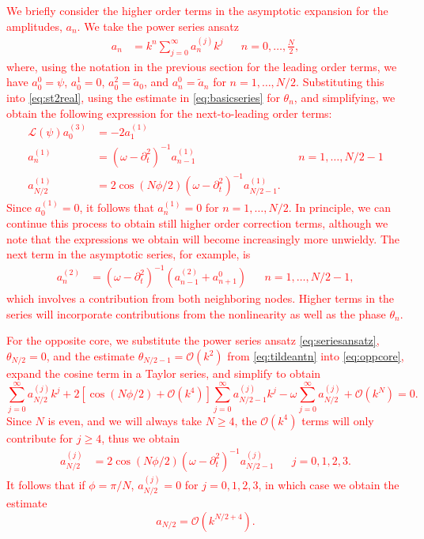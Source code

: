 \documentclass[11pt,reqno]{amsart}
\def\calL{{\mathcal L}}
\newcommand{\revised}[1]{ \textcolor{red}{#1} }
\begin{document}
\revised{
We briefly consider the higher order terms in the asymptotic expansion for the amplitudes, $a_n$. We take the power series ansatz
\begin{align}\label{eq:seriesansatz}
a_n &= k^n \sum_{j=0}^\infty a_n^{(j)} k^j && n = 0, \dots, \frac{N}{2},
\end{align}
where, using the notation in the previous section for the leading order terms, we have $a_0^{0}= \psi$, $a_0^{1}=0$, $a_0^{2} = \tilde{a}_0$, and $a_n^{0} = \tilde{a}_n$ for $n = 1, \dots, N/2$. Substituting this into \cref{eq:st2real}, using the estimate in \cref{eq:basicseries} for $\theta_n$, and simplifying, we obtain the following expression for the next-to-leading order terms:
\begin{align*}
\calL(\psi) a_0^{(3)} &= -2 a_1^{(1)} \\
a_n^{(1)} &= (\omega - \partial_t^2)^{-1}a_{n-1}^{(1)} && n = 1, \dots, N/2-1 \\
a_{N/2}^{(1)} &= 2 \cos( N\phi/2)(\omega - \partial_t^2)^{-1} a_{N/2-1}^{(1)}.
\end{align*}
Since $a_0^{(1)}=0$, it follows that $a_n^{(1)}=0$ for $n = 1, \dots, N/2$. In principle, we can continue this process to obtain still higher order correction terms, although we note that the expressions we obtain will become increasingly more unwieldy. The next term in the asymptotic series, for example, is
\begin{align*}
a_n^{(2)} &= (\omega - \partial_t^2)^{-1}(a_{n-1}^{(2)} + a_{n+1}^{0}) && n = 1, \dots, N/2-1,
\end{align*}
which involves a contribution from both neighboring nodes. Higher terms in the series will incorporate contributions from the nonlinearity as well as the phase $\theta_n$.
}

\revised{
For the opposite core, we substitute the power series ansatz \cref{eq:seriesansatz}, $\theta_{N/2}=0$, and the estimate $\theta_{N/2-1} = \mathcal{O}(k^2)$ from \cref{eq:tildeantn} into \cref{eq:oppcore}, expand the cosine term in a Taylor series, and simplify to obtain
\[
\sum_{j=0}^\infty a_{N/2}^{(j)} k^j + 2 \left[\cos( N\phi/2) + \mathcal{O}(k^4) \right] \sum_{j=0}^\infty a_{N/2-1}^{(j)} k^j - \omega \sum_{j=0}^\infty a_{N/2}^{(j)} + \mathcal{O}(k^N) = 0.
\]
Since $N$ is even, and we will always take $N\geq 4$, the $\mathcal{O}(k^4)$ terms will only contribute for $j \geq 4$, thus we obtain
\begin{align*}
a_{N/2}^{(j)} &= 2 \cos( N\phi/2)(\omega - \partial_t^2)^{-1} a_{N/2-1}^{(j)} && j = 0,1,2,3.
\end{align*}
It follows that if $\phi=\pi/N$, $a_{N/2}^{(j)}=0$ for $j = 0,1,2,3$, in which case we obtain the estimate
\[
a_{N/2} = \mathcal{O}\left({k^{N/2+4}}\right).
\]
}
\end{document}
